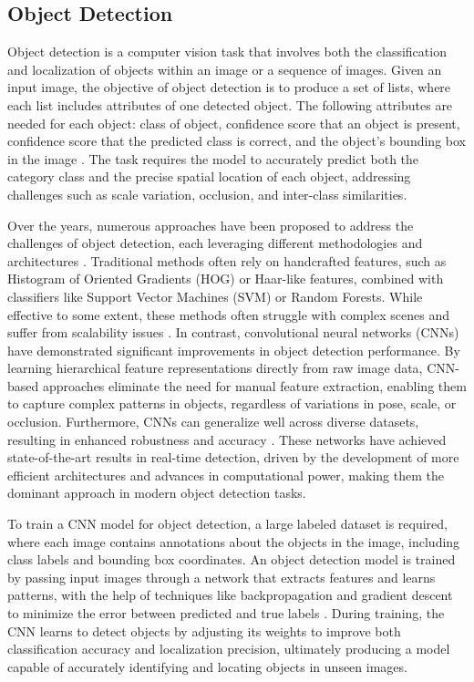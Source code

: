 \documentclass[journal,onecolumn,12pt]{IEEEtran}
\begin{document}
\subsection{Object Detection}
\label{secmAP}
Object detection is a computer vision task that involves both the classification and localization of objects within an image or a sequence of images. Given an input image, the objective of object detection is to produce a set of lists, where each list includes attributes of one detected object. The following attributes are needed for each object: class of object, confidence score that an object is present, confidence score that the predicted class is correct, and the object's bounding box in the image \cite{8627998}. The task requires the model to accurately predict both the category class and the precise spatial location of each object, addressing challenges such as scale variation, occlusion, and inter-class similarities.

Over the years, numerous approaches have been proposed to address the challenges of object detection, each leveraging different methodologies and architectures \cite{zou2023object}. Traditional methods often rely on handcrafted features, such as Histogram of Oriented Gradients (HOG) or Haar-like features, combined with classifiers like Support Vector Machines (SVM) or Random Forests. While effective to some extent, these methods often struggle with complex scenes and suffer from scalability issues \cite{10099639}. In contrast, convolutional neural networks (CNNs) have demonstrated significant improvements in object detection performance. By learning hierarchical feature representations directly from raw image data, CNN-based approaches eliminate the need for manual feature extraction, enabling them to capture complex patterns in objects, regardless of variations in pose, scale, or occlusion. Furthermore, CNNs can generalize well across diverse datasets, resulting in enhanced robustness and accuracy \cite{cnnvstrad}. These networks have achieved state-of-the-art results in real-time detection, driven by the development of more efficient architectures and advances in computational power, making them the dominant approach in modern object detection tasks.

To train a CNN model for object detection, a large labeled dataset is required, where each image contains annotations about the objects in the image, including class labels and bounding box coordinates. An object detection model is trained by passing input images through a network that extracts features and learns patterns, with the help of techniques like backpropagation and gradient descent to minimize the error between predicted and true labels \cite{8825470}. During training, the CNN learns to detect objects by adjusting its weights to improve both classification accuracy and localization precision, ultimately producing a model capable of accurately identifying and locating objects in unseen images.
\end{document}
